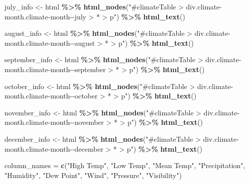 \documentclass[
]{article}
\newenvironment{Shaded}{\begin{snugshade}}{\end{snugshade}}
\newcommand{\FunctionTok}[1]{\textcolor[rgb]{0.13,0.29,0.53}{\textbf{#1}}}
\newcommand{\NormalTok}[1]{#1}
\newcommand{\OtherTok}[1]{\textcolor[rgb]{0.56,0.35,0.01}{#1}}
\newcommand{\SpecialCharTok}[1]{\textcolor[rgb]{0.81,0.36,0.00}{\textbf{#1}}}
\newcommand{\StringTok}[1]{\textcolor[rgb]{0.31,0.60,0.02}{#1}}
\begin{document}
\begin{Shaded}
\begin{Highlighting}[]
\NormalTok{july\_info }\OtherTok{\textless{}{-}}\NormalTok{ html }\SpecialCharTok{\%\textgreater{}\%}
  \FunctionTok{html\_nodes}\NormalTok{(}\StringTok{"\#climateTable \textgreater{} div.climate{-}month.climate{-}month{-}{-}july \textgreater{} * \textgreater{} p"}\NormalTok{) }\SpecialCharTok{\%\textgreater{}\%}
  \FunctionTok{html\_text}\NormalTok{()}

\NormalTok{august\_info }\OtherTok{\textless{}{-}}\NormalTok{ html }\SpecialCharTok{\%\textgreater{}\%}
  \FunctionTok{html\_nodes}\NormalTok{(}\StringTok{"\#climateTable \textgreater{} div.climate{-}month.climate{-}month{-}{-}august \textgreater{} * \textgreater{} p"}\NormalTok{) }\SpecialCharTok{\%\textgreater{}\%}
  \FunctionTok{html\_text}\NormalTok{()}

\NormalTok{september\_info }\OtherTok{\textless{}{-}}\NormalTok{ html }\SpecialCharTok{\%\textgreater{}\%}
  \FunctionTok{html\_nodes}\NormalTok{(}\StringTok{"\#climateTable \textgreater{} div.climate{-}month.climate{-}month{-}{-}september \textgreater{} * \textgreater{} p"}\NormalTok{) }\SpecialCharTok{\%\textgreater{}\%}
  \FunctionTok{html\_text}\NormalTok{()}

\NormalTok{october\_info }\OtherTok{\textless{}{-}}\NormalTok{ html }\SpecialCharTok{\%\textgreater{}\%}
  \FunctionTok{html\_nodes}\NormalTok{(}\StringTok{"\#climateTable \textgreater{} div.climate{-}month.climate{-}month{-}{-}october \textgreater{} * \textgreater{} p"}\NormalTok{) }\SpecialCharTok{\%\textgreater{}\%}
  \FunctionTok{html\_text}\NormalTok{()}

\NormalTok{november\_info }\OtherTok{\textless{}{-}}\NormalTok{ html }\SpecialCharTok{\%\textgreater{}\%}
  \FunctionTok{html\_nodes}\NormalTok{(}\StringTok{"\#climateTable \textgreater{} div.climate{-}month.climate{-}month{-}{-}november \textgreater{} * \textgreater{} p"}\NormalTok{) }\SpecialCharTok{\%\textgreater{}\%}
  \FunctionTok{html\_text}\NormalTok{()}

\NormalTok{december\_info }\OtherTok{\textless{}{-}}\NormalTok{ html }\SpecialCharTok{\%\textgreater{}\%}
  \FunctionTok{html\_nodes}\NormalTok{(}\StringTok{"\#climateTable \textgreater{} div.climate{-}month.climate{-}month{-}{-}december \textgreater{} * \textgreater{} p"}\NormalTok{) }\SpecialCharTok{\%\textgreater{}\%}
  \FunctionTok{html\_text}\NormalTok{()}

\NormalTok{column\_names }\OtherTok{=} \FunctionTok{c}\NormalTok{(}\StringTok{"High Temp"}\NormalTok{, }\StringTok{"Low Temp"}\NormalTok{, }\StringTok{"Mean Temp"}\NormalTok{, }\StringTok{"Precipitation"}\NormalTok{, }\StringTok{"Humidity"}\NormalTok{, }\StringTok{"Dew Point"}\NormalTok{, }\StringTok{"Wind"}\NormalTok{, }\StringTok{"Pressure"}\NormalTok{, }\StringTok{"Visibility"}\NormalTok{)}


\end{Highlighting}
\end{Shaded}
\end{document}
